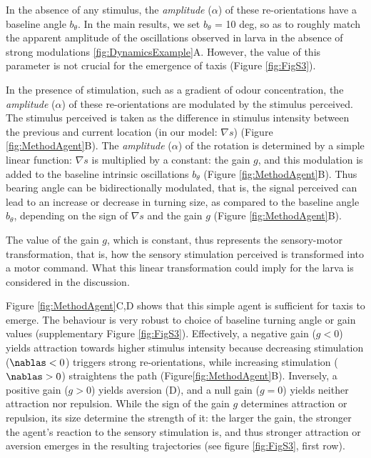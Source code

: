 \documentclass[11pt,a4paper]{article}
\newcommand{\todoBW}[1]{\todo[author=BW,color=orange, size=\tiny,inline]{#1}}
\begin{document}
In the absence of any stimulus, the {\it amplitude} ($\alpha$) of these re-orientations have a baseline angle $b_{\theta}$. In the main results, we set $b_{\theta}$ = 10 deg, so as to roughly match the apparent amplitude of the oscillations observed in larva in the absence of strong modulations \ref{fig:DynamicsExample}A. However, the value of this parameter is not crucial for the emergence of taxis (Figure \ref{fig:FigS3}).

In the presence of stimulation, such as a gradient of odour concentration, the {\it amplitude} ($\alpha$) of these re-orientations are modulated by the stimulus perceived. The stimulus perceived is taken as the difference in stimulus intensity between the previous and current location (in our model: $\nabla s$) (Figure \ref{fig:MethodAgent}B). 
The {\it amplitude} ($\alpha$) of the rotation is determined by a simple linear function: $\nabla s$ is multiplied by a constant: the gain $g$, and this modulation is added to the baseline intrinsic oscillations $b_{\theta}$ (Figure \ref{fig:MethodAgent}B). Thus bearing angle can be bidirectionally modulated, that is, the signal perceived can lead to an increase or decrease in turning size, as compared to the baseline angle $b_{\theta}$, depending on the sign of $\nabla s$  and the gain $g$ (Figure \ref{fig:MethodAgent}B).

The value of the gain $g$, which is constant, thus represents the sensory-motor transformation, that is, how the sensory stimulation perceived is transformed into a motor command. What this linear transformation could imply for the larva is considered in the discussion. 

Figure \ref{fig:MethodAgent}C,D shows that this simple agent is sufficient for taxis to emerge. The behaviour is very robust to choice of baseline turning angle or gain values (supplementary Figure \ref{fig:FigS3}). Effectively, a negative gain ($g<0$) yields attraction towards higher stimulus intensity because decreasing stimulation ($\nablas<0$) triggers strong re-orientations, while increasing stimulation ($\nablas>0$) straightens the path (Figure\ref{fig:MethodAgent}B). Inversely, a positive gain ($g>0$) yields aversion (D), and a null gain ($g=0$) yields neither attraction nor repulsion. While the sign of the gain $g$ determines attraction or repulsion, its size determine the strength of it: the larger the gain, the stronger the agent's reaction to the sensory stimulation is, and thus stronger attraction or aversion emerges in the resulting trajectories (see figure \ref{fig:FigS3}, first row).
\end{document}
